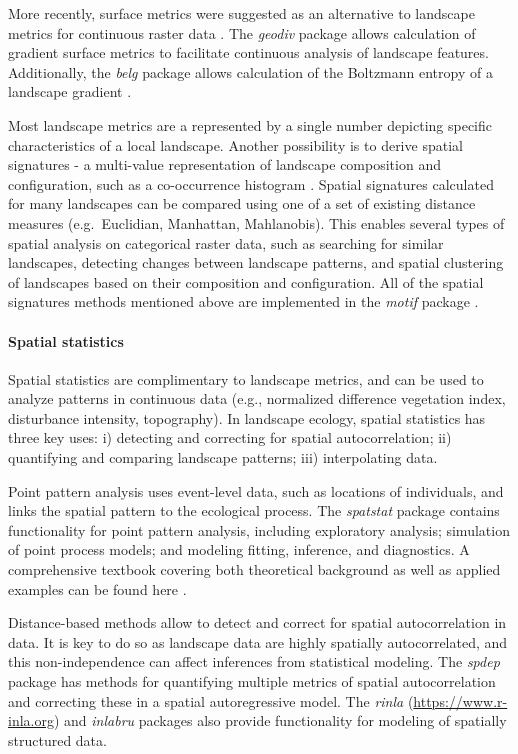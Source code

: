\documentclass[smallextended]{svjour3}       %
\begin{document}
More recently, surface metrics were suggested as an alternative to landscape metrics for continuous raster data \cite{McGarigal2009}.
The \emph{geodiv} package \cite{Smith2020} allows calculation of gradient surface metrics to facilitate continuous analysis of landscape features.
Additionally, the \emph{belg} package allows calculation of the Boltzmann entropy of a landscape gradient \cite{Nowosad2020}.

Most landscape metrics are a represented by a single number depicting specific characteristics of a local landscape.
Another possibility is to derive spatial signatures - a multi-value representation of landscape composition and configuration, such as a co-occurrence histogram \cite{Nowosad2021}.
Spatial signatures calculated for many landscapes can be compared using one of a set of existing distance measures (e.g.~Euclidian, Manhattan, Mahlanobis).
This enables several types of spatial analysis on categorical raster data, such as searching for similar landscapes, detecting changes between landscape patterns, and spatial clustering of landscapes based on their composition and configuration.
All of the spatial signatures methods mentioned above are implemented in the \emph{motif} package \cite{Nowosad2021}.

\hypertarget{spatial-statistics}{%
\paragraph{Spatial statistics}\label{spatial-statistics}}

Spatial statistics are complimentary to landscape metrics, and can be used to analyze patterns in continuous data (e.g., normalized difference vegetation index, disturbance intensity, topography).
In landscape ecology, spatial statistics has three key uses: i) detecting and correcting for spatial autocorrelation; ii) quantifying and comparing landscape patterns; iii) interpolating data.

Point pattern analysis uses event-level data, such as locations of individuals, and links the spatial pattern to the ecological process.
The \emph{spatstat} package \cite{Baddeley2005} contains functionality for point pattern analysis, including exploratory analysis; simulation of point process models; and modeling fitting, inference, and diagnostics.
A comprehensive textbook covering both theoretical background as well as applied examples can be found here \cite{Baddeley2015}.

Distance-based methods allow to detect and correct for spatial autocorrelation in data.
It is key to do so as landscape data are highly spatially autocorrelated, and this non-independence can affect inferences from statistical modeling.
The \emph{spdep} package \cite{Bivand2013} has methods for quantifying multiple metrics of spatial autocorrelation and correcting these in a spatial autoregressive model.
The \emph{rinla} \cite{Rue2009} (\url{https://www.r-inla.org}) and \emph{inlabru} \cite{Bachl2019} packages also provide functionality for modeling of spatially structured data.
\end{document}
